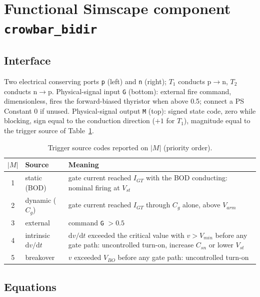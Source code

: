 \documentclass[11pt,a4paper]{article}
\begin{document}
\section{Functional Simscape component \texttt{crowbar\_bidir}}

\subsection{Interface}

Two electrical conserving ports \texttt{p} (left) and \texttt{n} (right); $T_1$ conducts
p$\to$n, $T_2$ conducts n$\to$p. Physical-signal input \texttt{G} (bottom): external fire
command, dimensionless, fires the forward-biased thyristor when above 0.5; connect a PS
Constant 0 if unused. Physical-signal output \texttt{M} (top): signed state code, zero while
blocking, sign equal to the conduction direction ($+1$ for $T_1$), magnitude equal to the
trigger source of Table~\ref{tab:M}.

\begin{table}[htbp]
\centering
\caption{Trigger source codes reported on $|M|$ (priority order).}
\label{tab:M}
\begin{tabular}{@{}clp{8.5cm}@{}}
\toprule
$|M|$ & Source & Meaning \\
\midrule
1 & static (BOD) & gate current reached $I_{GT}$ with the BOD conducting: nominal firing at $V_{st}$ \\
2 & dynamic ($C_g$) & gate current reached $I_{GT}$ through $C_g$ alone, above $V_{arm}$ \\
3 & external & command \texttt{G} $> 0.5$ \\
4 & intrinsic $\mathrm{d}v/\mathrm{d}t$ & $\mathrm{d}v/\mathrm{d}t$ exceeded the critical value with $v > V_{min}$ before any gate path: uncontrolled turn-on, increase $C_{sn}$ or lower $V_{st}$ \\
5 & breakover & $v$ exceeded $V_{BO}$ before any gate path: uncontrolled turn-on \\
\bottomrule
\end{tabular}
\end{table}

\subsection{Equations}
\end{document}
